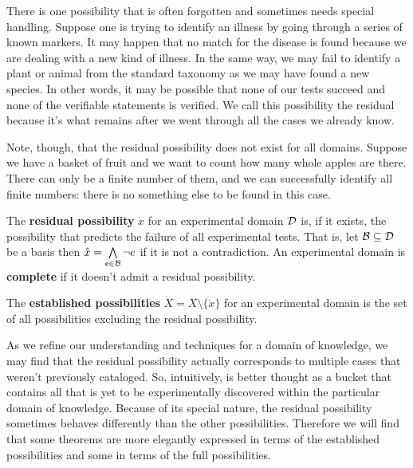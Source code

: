 \documentclass[11pt,letterpaper,fleqn]{memoir} %
\begin{document}
There is one possibility that is often forgotten and sometimes needs special handling. Suppose one is trying to identify an illness by going through a series of known markers. It may happen that no match for the disease is found because we are dealing with a new kind of illness. In the same way, we may fail to identify a plant or animal from the standard taxonomy as we may have found a new species. In other words, it may be possible that none of our tests succeed and none of the verifiable statements is verified. We call this possibility the residual because it's what remains after we went through all the cases we already know.

Note, though, that the residual possibility does not exist for all domains. Suppose we have a basket of fruit and we want to count how many whole apples are there. There can only be a finite number of them, and we can successfully identify all finite numbers: there is no something else to be found in this case.

\begin{mathSection}
	\begin{prop}
		The \textbf{residual possibility} $\mathring{x}$ for an experimental domain $\edomain$ is, if it exists, the possibility that predicts the failure of all experimental tests. That is, let $\basis \subseteq \edomain$ be a basis then  $\mathring{x} = \bigAND\limits_{\stmt[e] \in \basis} \NOT e$ if it is not a contradiction. An experimental domain is \textbf{complete} if it doesn't admit a residual possibility.
	\end{prop}

	\begin{prop}
	The \textbf{established possibilities} $\dot{X}=X\setminus\{\mathring{x}\}$ for an experimental domain is the set of all possibilities excluding the residual possibility.
\end{prop}
\end{mathSection}

As we refine our understanding and techniques for a domain of knowledge, we may find that the residual possibility actually corresponds to multiple cases that weren't previously cataloged. So, intuitively, is better thought as a bucket that contains all that is yet to be experimentally discovered within the particular domain of knowledge. Because of its special nature, the residual possibility sometimes behaves differently than the other possibilities. Therefore we will find that some theorems are more elegantly expressed in terms of the established possibilities and some in terms of the full possibilities.
\end{document}
